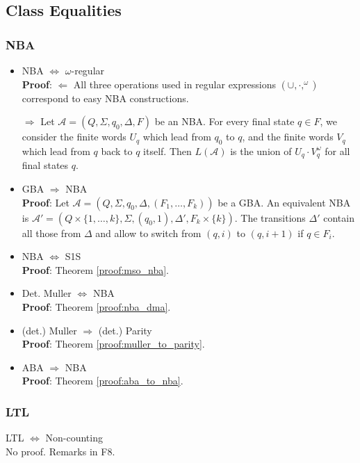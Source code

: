 \documentclass{article}
\begin{document}
\subsection{Class Equalities}
\subsubsection{NBA}
\begin{itemize}
	\item NBA $\Leftrightarrow$ $\omega$-regular \\
    	\textbf{Proof}: $\bm{\Leftarrow}$ All three operations used in regular expressions $(\cup, \cdot, ^\omega)$ correspond to easy NBA constructions.
    	
    	$\bm{\Rightarrow}$ Let $\mathcal{A} = (Q, \Sigma, q_0, \Delta, F)$ be an NBA. For every final state $q \in F$, we consider the finite words $U_q$ which lead from $q_0$ to $q$, and the finite words $V_q$ which lead from $q$ back to $q$ itself. Then $L(\mathcal{A})$ is the union of $U_q \cdot V_q^\omega$ for all final states $q$.
	\item GBA $\Rightarrow$ NBA \\
    	\textbf{Proof}: Let $\mathcal{A} = (Q, \Sigma, q_0, \Delta, (F_1, \dots, F_k))$ be a GBA. An equivalent NBA is $\mathcal{A}' = (Q \times \{1, \dots, k\}, \Sigma, (q_0, 1), \Delta', F_k \times \{k\})$. The transitions $\Delta'$ contain all those from $\Delta$ and allow to switch from $(q, i)$ to $(q, i+1)$ if $q \in F_i$.
    \item NBA $\Leftrightarrow$ S1S \\
    	\textbf{Proof}: Theorem \ref{proof:mso_nba}.
    \item Det. Muller $\Leftrightarrow$ NBA \\
    	\textbf{Proof}: Theorem \ref{proof:nba_dma}.
   	\item (det.) Muller $\Rightarrow$ (det.) Parity \\
   		\textbf{Proof}: Theorem \ref{proof:muller_to_parity}.
   	\item ABA $\Rightarrow$ NBA \\
   		\textbf{Proof}: Theorem \ref{proof:aba_to_nba}.
\end{itemize}

\subsubsection{LTL}
LTL $\Leftrightarrow$ Non-counting \\
No proof. Remarks in F8.
\end{document}

